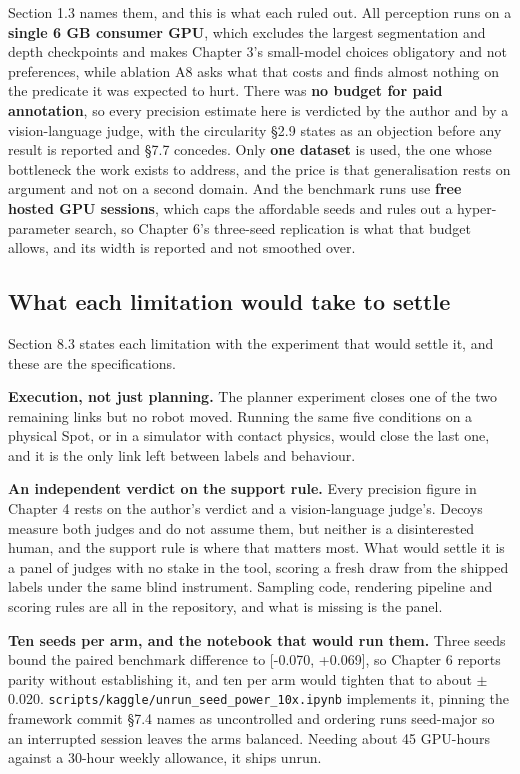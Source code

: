 Section 1.3 names them, and this is what each ruled out. All perception runs on a \textbf{single 6 GB consumer GPU}, which excludes the largest segmentation and depth checkpoints and makes Chapter 3's small-model choices obligatory and not preferences, while ablation A8 asks what that costs and finds almost nothing on the predicate it was expected to hurt. There was \textbf{no budget for paid annotation}, so every precision estimate here is verdicted by the author and by a vision-language judge, with the circularity \S{}2.9 states as an objection before any result is reported and \S{}7.7 concedes. Only \textbf{one dataset} is used, the one whose bottleneck the work exists to address, and the price is that generalisation rests on argument and not on a second domain. And the benchmark runs use \textbf{free hosted GPU sessions}, which caps the affordable seeds and rules out a hyper-parameter search, so Chapter 6's three-seed replication is what that budget allows, and its width is reported and not smoothed over.

\subsection{What each limitation would take to settle}

Section 8.3 states each limitation with the experiment that would settle it, and these are the specifications.

\textbf{Execution, not just planning.} The planner experiment closes one of the two remaining links but no robot moved. Running the same five conditions on a physical Spot, or in a simulator with contact physics, would close the last one, and it is the only link left between labels and behaviour.

\textbf{An independent verdict on the support rule.} Every precision figure in Chapter 4 rests on the author's verdict and a vision-language judge's. Decoys measure both judges and do not assume them, but neither is a disinterested human, and the support rule is where that matters most. What would settle it is a panel of judges with no stake in the tool, scoring a fresh draw from the shipped labels under the same blind instrument. Sampling code, rendering pipeline and scoring rules are all in the repository, and what is missing is the panel.

\textbf{Ten seeds per arm, and the notebook that would run them.} Three seeds bound the paired benchmark difference to [-0.070, +0.069], so Chapter 6 reports parity without establishing it, and ten per arm would tighten that to about $\pm$0.020. \texttt{scripts/kaggle/unrun\_\allowbreak{}seed\_\allowbreak{}power\_\allowbreak{}10x.ipynb} implements it, pinning the framework commit \S{}7.4 names as uncontrolled and ordering runs seed-major so an interrupted session leaves the arms balanced. Needing about 45 GPU-hours against a 30-hour weekly allowance, it ships unrun.

